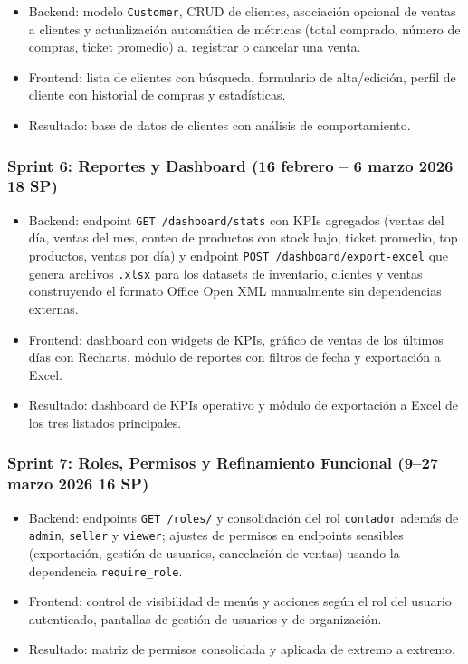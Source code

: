 \begin{itemize}
\tightlist
\item
  Backend: modelo \texttt{Customer}, CRUD de clientes, asociación opcional de ventas a clientes y actualización automática de métricas (total comprado, número de compras, ticket promedio) al registrar o cancelar una venta.
\item
  Frontend: lista de clientes con búsqueda, formulario de alta/edición, perfil de cliente con historial de compras y estadísticas.
\item
  Resultado: base de datos de clientes con análisis de comportamiento.
\end{itemize}

\subsubsection{Sprint 6: Reportes y Dashboard (16 febrero -- 6 marzo 2026 \textbar{} 18 SP)}\label{sprint-6-reportes-y-dashboard-16-febrero-6-marzo-2026-18-sp}

\begin{itemize}
\tightlist
\item
  Backend: endpoint \texttt{GET\ /dashboard/stats} con KPIs agregados (ventas del día, ventas del mes, conteo de productos con stock bajo, ticket promedio, top productos, ventas por día) y endpoint \texttt{POST\ /dashboard/export-excel} que genera archivos \texttt{.xlsx} para los datasets de inventario, clientes y ventas construyendo el formato Office Open XML manualmente sin dependencias externas.
\item
  Frontend: dashboard con widgets de KPIs, gráfico de ventas de los últimos días con Recharts, módulo de reportes con filtros de fecha y exportación a Excel.
\item
  Resultado: dashboard de KPIs operativo y módulo de exportación a Excel de los tres listados principales.
\end{itemize}

\subsubsection{Sprint 7: Roles, Permisos y Refinamiento Funcional (9--27 marzo 2026 \textbar{} 16 SP)}\label{sprint-7-roles-permisos-y-refinamiento-funcional-927-marzo-2026-16-sp}

\begin{itemize}
\tightlist
\item
  Backend: endpoints \texttt{GET\ /roles/} y consolidación del rol \texttt{contador} además de \texttt{admin}, \texttt{seller} y \texttt{viewer}; ajustes de permisos en endpoints sensibles (exportación, gestión de usuarios, cancelación de ventas) usando la dependencia \texttt{require\_role}.
\item
  Frontend: control de visibilidad de menús y acciones según el rol del usuario autenticado, pantallas de gestión de usuarios y de organización.
\item
  Resultado: matriz de permisos consolidada y aplicada de extremo a extremo.
\end{itemize}

